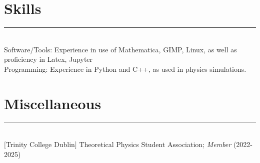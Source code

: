 \documentclass{article}
\begin{document}
\section*{Skills}
\hrule~\\
Software/Tools: Experience in use of Mathematica, GIMP, Linux, as well as proficiency in Latex, Jupyter\\
Programming: Experience in Python and C++, as used in physics simulations.
\section*{Miscellaneous}
\hrule~\\
$[$Trinity College Dublin$]$ Theoretical Physics Student Association; \textit{Member} (2022-2025)
\end{document}
